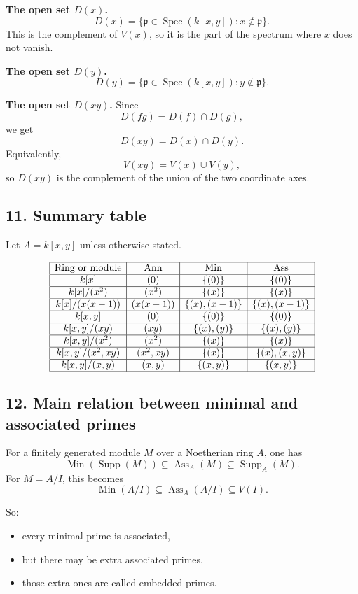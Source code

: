 \documentclass[12pt,a4paper]{article}
\theoremstyle{notespace}
\DeclareMathOperator{\Spec}{Spec}
\DeclareMathOperator{\Ass}{Ass}
\DeclareMathOperator{\Ann}{Ann}
\DeclareMathOperator{\Supp}{Supp}
\DeclareMathOperator{\Min}{Min}
\begin{document}
\textbf{The open set \(D(x)\).}
\[
D(x)=\{\mathfrak p\in \Spec(k[x,y]):x\notin \mathfrak p\}.
\]
This is the complement of \(V(x)\), so it is the part of the spectrum where \(x\) does not vanish.

\textbf{The open set \(D(y)\).}
\[
D(y)=\{\mathfrak p\in \Spec(k[x,y]):y\notin \mathfrak p\}.
\]

\textbf{The open set \(D(xy)\).}
Since
\[
D(fg)=D(f)\cap D(g),
\]
we get
\[
D(xy)=D(x)\cap D(y).
\]
Equivalently,
\[
V(xy)=V(x)\cup V(y),
\]
so \(D(xy)\) is the complement of the union of the two coordinate axes.

\subsection{11. Summary table}

Let \(A=k[x,y]\) unless otherwise stated.

\[
\begin{array}{|c|c|c|c|}
	\hline
	\text{Ring or module} & \Ann & \Min & \Ass \\
	\hline
	k[x] & (0) & \{(0)\} & \{(0)\} \\
	\hline
	k[x]/(x^2) & (x^2) & \{(x)\} & \{(x)\} \\
	\hline
	k[x]/(x(x-1)) & (x(x-1)) & \{(x),(x-1)\} & \{(x),(x-1)\} \\
	\hline
	k[x,y] & (0) & \{(0)\} & \{(0)\} \\
	\hline
	k[x,y]/(xy) & (xy) & \{(x),(y)\} & \{(x),(y)\} \\
	\hline
	k[x,y]/(x^2) & (x^2) & \{(x)\} & \{(x)\} \\
	\hline
	k[x,y]/(x^2,xy) & (x^2,xy) & \{(x)\} & \{(x),(x,y)\} \\
	\hline
	k[x,y]/(x,y) & (x,y) & \{(x,y)\} & \{(x,y)\} \\
	\hline
\end{array}
\]

\subsection{12. Main relation between minimal and associated primes}

For a finitely generated module \(M\) over a Noetherian ring \(A\), one has
\[
\Min(\Supp(M))\subseteq \Ass_A(M)\subseteq \Supp_A(M).
\]
For \(M=A/I\), this becomes
\[
\Min(A/I)\subseteq \Ass_A(A/I)\subseteq V(I).
\]

So:
\begin{itemize}
	\item every minimal prime is associated,
	\item but there may be extra associated primes,
	\item those extra ones are called embedded primes.
\end{itemize}
\end{document}
